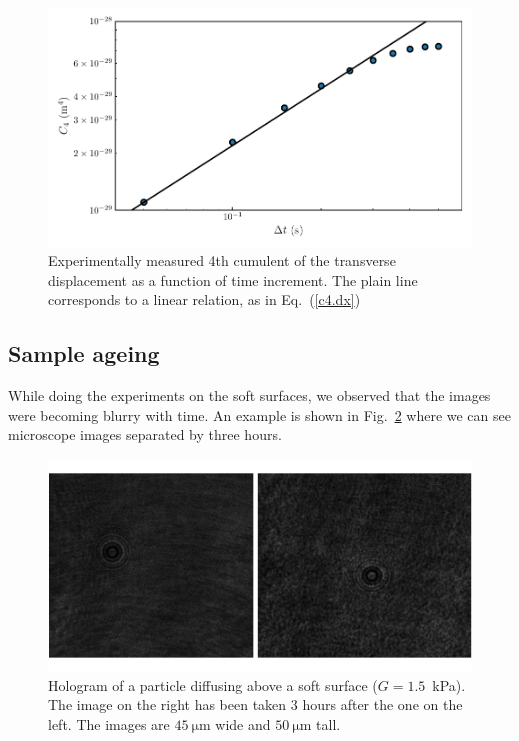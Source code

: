 \begin{figure}[H]
	\centering
	\includegraphics{02_body/chapter4/images/4th_cumulent/fourth.pdf}
	\caption{Experimentally measured 4th cumulent of the transverse displacement as a function of time increment. The plain line corresponds to a linear relation, as in Eq.~(\ref{c4.dx})}
	\label{fig.forth}
\end{figure}
\subsection{Sample ageing}

While doing the experiments on the soft surfaces, we observed that the images were becoming blurry with time. An example is shown in Fig.~\ref{fig.3hours1p5kpa} where we can see microscope images separated by three hours.


\begin{figure}[h]
	\centering
	\includegraphics{02_body/chapter4/images/ageing/diffusing_particle_1p5kpa_3hours.pdf}
	\caption{Hologram of a particle diffusing above a soft surface ($G=1.5$~kPa). The image on the right has been taken 3 hours after the one on the left. The images are $45~\mathrm{\mu m}$ wide and $50~\mathrm{\mu m}$ tall. }
	\label{fig.3hours1p5kpa}
\end{figure}

